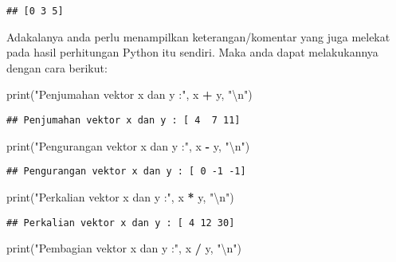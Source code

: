 \documentclass[
]{docs}
\newenvironment{Shaded}{\begin{snugshade}}{\end{snugshade}}
\newcommand{\BuiltInTok}[1]{#1}
\newcommand{\CharTok}[1]{\textcolor[rgb]{0.31,0.60,0.02}{#1}}
\newcommand{\NormalTok}[1]{#1}
\newcommand{\OperatorTok}[1]{\textcolor[rgb]{0.81,0.36,0.00}{\textbf{#1}}}
\newcommand{\StringTok}[1]{\textcolor[rgb]{0.31,0.60,0.02}{#1}}
\begin{document}
\begin{verbatim}
## [0 3 5]
\end{verbatim}

Adakalanya anda perlu menampilkan keterangan/komentar yang juga melekat pada hasil perhitungan Python itu sendiri. Maka anda dapat melakukannya dengan cara berikut:

\begin{Shaded}
\begin{Highlighting}[]
\BuiltInTok{print}\NormalTok{(}\StringTok{"Penjumahan vektor x dan y :"}\NormalTok{, x }\OperatorTok{+}\NormalTok{ y, }\StringTok{"}\CharTok{\textbackslash{}n}\StringTok{"}\NormalTok{)}
\end{Highlighting}
\end{Shaded}

\begin{verbatim}
## Penjumahan vektor x dan y : [ 4  7 11]
\end{verbatim}

\begin{Shaded}
\begin{Highlighting}[]
\BuiltInTok{print}\NormalTok{(}\StringTok{"Pengurangan vektor x dan y :"}\NormalTok{, x }\OperatorTok{{-}}\NormalTok{ y, }\StringTok{"}\CharTok{\textbackslash{}n}\StringTok{"}\NormalTok{)}
\end{Highlighting}
\end{Shaded}

\begin{verbatim}
## Pengurangan vektor x dan y : [ 0 -1 -1]
\end{verbatim}

\begin{Shaded}
\begin{Highlighting}[]
\BuiltInTok{print}\NormalTok{(}\StringTok{"Perkalian vektor x dan y :"}\NormalTok{, x }\OperatorTok{*}\NormalTok{ y, }\StringTok{"}\CharTok{\textbackslash{}n}\StringTok{"}\NormalTok{)}
\end{Highlighting}
\end{Shaded}

\begin{verbatim}
## Perkalian vektor x dan y : [ 4 12 30]
\end{verbatim}

\begin{Shaded}
\begin{Highlighting}[]
\BuiltInTok{print}\NormalTok{(}\StringTok{"Pembagian vektor x dan y :"}\NormalTok{, x }\OperatorTok{/}\NormalTok{ y, }\StringTok{"}\CharTok{\textbackslash{}n}\StringTok{"}\NormalTok{)}
\end{Highlighting}
\end{Shaded}
\end{document}

